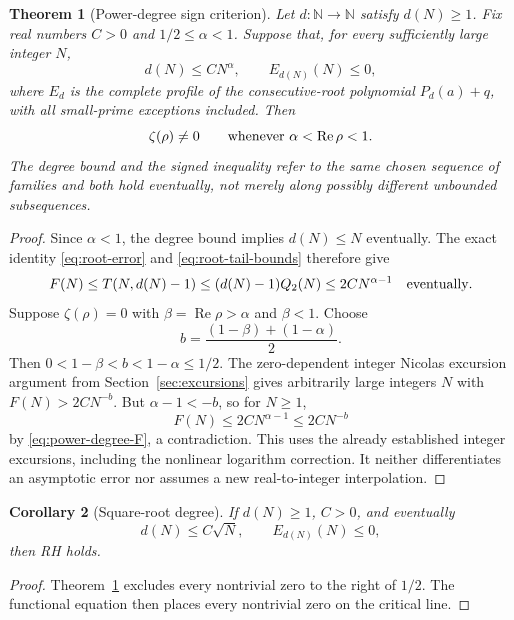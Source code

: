 \documentclass[11pt]{article}
\newtheorem{theorem}{Theorem}[section]
\newtheorem{corollary}[theorem]{Corollary}
\theoremstyle{definition}
\newcommand{\N}{\mathbb N}
\begin{document}
\begin{theorem}[Power-degree sign criterion]\label{thm:power-degree}
Let $d:\N\to\N$ satisfy $d(N)\ge1$. Fix real numbers $C>0$ and
$1/2\le\alpha<1$. Suppose that, for every sufficiently large integer $N$,
\begin{equation}\label{eq:power-degree-hypotheses}
 d(N)\le CN^\alpha,\qquad E_{d(N)}(N)\le0,
\end{equation}
where $E_d$ is the complete profile of the consecutive-root polynomial
$P_d(a)+q$, with all small-prime exceptions included.
Then
\[
 \zeta(\rho)\ne0\qquad
 \hbox{whenever }\alpha<\operatorname{Re}\rho<1.
\]
The degree bound and the signed inequality refer to the same chosen
sequence of families and both hold eventually, not merely along
possibly different unbounded subsequences.
\end{theorem}
\begin{proof}
Since $\alpha<1$, the degree bound implies $d(N)\le N$ eventually.
The exact identity \eqref{eq:root-error} and
\eqref{eq:root-tail-bounds} therefore give
\begin{equation}\label{eq:power-degree-F}
 F(N)\le T(N,d(N)-1)
       \le(d(N)-1)Q_2(N)
       \le2C N^{\alpha-1}
 \quad\hbox{eventually}.
\end{equation}
Suppose $\zeta(\rho)=0$ with $\beta=\operatorname{Re}\rho>\alpha$
and $\beta<1$. Choose
\[
 b=\frac{(1-\beta)+(1-\alpha)}2.
\]
Then $0<1-\beta<b<1-\alpha\le1/2$. The zero-dependent
integer Nicolas excursion argument from
Section~\ref{sec:excursions} gives arbitrarily large integers $N$
with $F(N)>2C N^{-b}$. But $\alpha-1<-b$, so for $N\ge1$,
\[
 F(N)\le2C N^{\alpha-1}\le2C N^{-b}
\]
by \eqref{eq:power-degree-F}, a contradiction.
This uses the already established integer excursions, including the
nonlinear logarithm correction. It neither differentiates an
asymptotic error nor assumes a new real-to-integer interpolation.
\end{proof}

\begin{corollary}[Square-root degree]\label{cor:sqrt-degree-RH}
If $d(N)\ge1$, $C>0$, and eventually
\[
 d(N)\le C\sqrt N,\qquad E_{d(N)}(N)\le0,
\]
then RH holds.
\end{corollary}
\begin{proof}
Theorem~\ref{thm:power-degree} excludes every nontrivial zero to
the right of $1/2$. The functional equation then places every
nontrivial zero on the critical line.
\end{proof}
\end{document}
